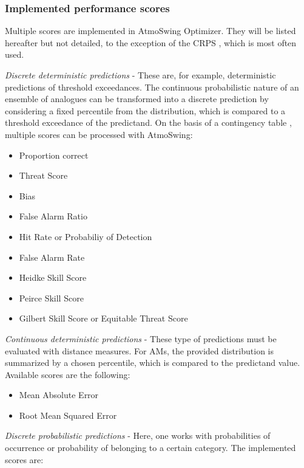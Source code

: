 \documentclass[review]{elsarticle}
\begin{document}
\subsubsection{Implemented performance scores}
\label{sec:scores}

Multiple scores are implemented in AtmoSwing Optimizer. They will be listed hereafter but not detailed, to the exception of the CRPS \citep[Continuous Ranked Probability Score,][]{Brown1974, Matheson1976, Hersbach2000}, which is most often used. 


\textit{Discrete deterministic predictions} - These are, for example, deterministic predictions of threshold exceedances. The continuous probabilistic nature of an ensemble of analogues can be transformed into a discrete prediction by considering a fixed percentile from the distribution, which is compared to a threshold exceedance of the predictand. On the basis of a contingency table \citep{Wilks2006}, multiple scores can be processed with AtmoSwing:

\begin{itemize}
	\item Proportion correct \citep{Finley1884}
	\item Threat Score \citep{Gilbert1884}
	\item Bias
	\item False Alarm Ratio
	\item Hit Rate or Probabiliy of Detection
	\item False Alarm Rate
	\item Heidke Skill Score \citep{Heidke1926}
	\item Peirce Skill Score \citep{Peirce1884}
	\item Gilbert Skill Score or Equitable Threat Score \citep{Gilbert1884}
\end{itemize}


\textit{Continuous deterministic predictions} - These type of predictions must be evaluated with distance measures. For AMs, the provided distribution is summarized by a chosen percentile, which is compared to the predictand value. Available scores are the following:

\begin{itemize}
	\item Mean Absolute Error
	\item Root Mean Squared Error
\end{itemize}


\textit{Discrete probabilistic predictions} - Here, one works with probabilities of occurrence or probability of belonging to a certain category. The implemented scores are:
\end{document}
